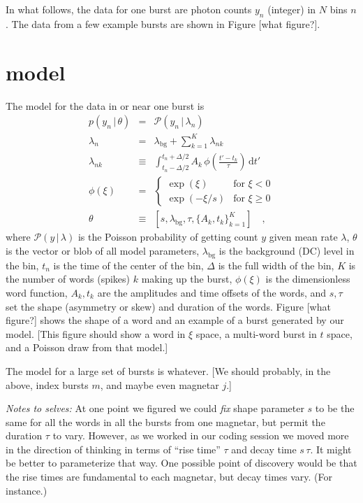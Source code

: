 \documentclass[12pt]{article}
\newcommand{\given}{\,|\,}
\newcommand{\dd}{\mathrm{d}}
\renewcommand{\count}{y}
\newcommand{\pars}{\theta}
\newcommand{\mean}{\lambda}
\newcommand{\Poisson}{{\mathcal P}}
\newcommand{\bg}{\mathrm{bg}}
\newcommand{\word}{\phi}
\begin{document}
In what follows, the data for one burst are photon counts $\count_n$ (integer) in $N$ bins $n$.
The data from a few example bursts are shown in Figure [what figure?].

\section{model}

The model for the data in or near one burst is
\begin{eqnarray}
p(\count_n\given\pars) &=& \Poisson(\count_n\given\mean_n)
\\
\mean_n &=& \mean_{\bg} + \sum_{k=1}^K \mean_{nk}
\\
\mean_{nk} &\equiv& \int_{t_n-\Delta/2}^{t_n+\Delta/2} A_k\,\word(\frac{t'-t_k}{\tau})\,\dd t'
\\
\word(\xi) &=& \left\{\begin{array}{ll}\exp(\xi) & \mbox{for $\xi<0$}\\ \exp(-\xi/s) & \mbox{for $\xi\geq 0$}\end{array}\right.
\\
\theta &\equiv& [s, \mean_{\bg}, \tau, \{A_k, t_k\}_{k=1}^K ]
\quad,
\end{eqnarray}
where $\Poisson(\count\given\mean)$ is the Poisson probability of getting count $y$ given mean rate $\mean$,
  $\pars$ is the vector or blob of all model parameters,
  $\mean_{\bg}$ is the background (DC) level in the bin,
  $t_n$ is the time of the center of the bin,
  $\Delta$ is the full width of the bin,
  $K$ is the number of words (spikes) $k$ making up the burst,
  $\phi(\xi)$ is the dimensionless word function,
  $A_k, t_k$ are the amplitudes and time offsets of the words,
  and $s, \tau$ set the shape (asymmetry or skew) and duration of the words.
Figure [what figure?] shows the shape of a word
  and an example of a burst generated by our model.
[This figure should show a word in $\xi$ space,
  a multi-word burst in $t$ space,
  and a Poisson draw from that model.]

The model for a large set of bursts is whatever.
[We should probably, in the above, index bursts $m$,
  and maybe even magnetar $j$.]

\emph{Notes to selves:}
At one point we figured we could \emph{fix} shape parameter $s$
  to be the same for all the words in all the bursts from one magnetar,
  but permit the duration $\tau$ to vary.
However, as we worked in our coding session we moved more in the direction
  of thinking in terms of ``rise time'' $\tau$ and decay time $s\,\tau$.
It might be better to parameterize that way.
One possible point of discovery would be that the rise times
  are fundamental to each magnetar,
  but decay times vary.
(For instance.)
\end{document}
